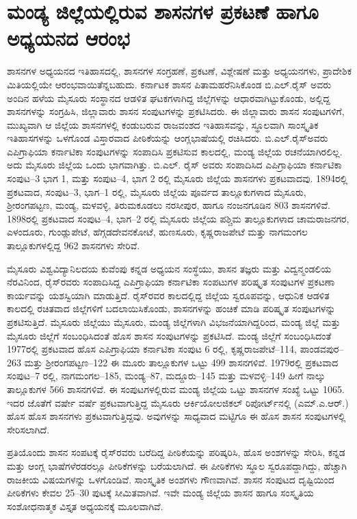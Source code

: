 \section{ಮಂಡ್ಯ ಜಿಲ್ಲೆಯಲ್ಲಿರುವ ಶಾಸನಗಳ ಪ್ರಕಟಣೆ ಹಾಗೂ ಅಧ್ಯಯನದ ಆರಂಭ}

ಶಾಸನಗಳ ಅಧ್ಯಯನದ ಇತಿಹಾಸದಲ್ಲಿ, ಶಾಸನಗಳ ಸಂಗ್ರಹಣೆ, ಪ್ರಕಟಣೆ, ವಿಶ್ಲೇಷಣೆ ಮತ್ತು ಅಧ್ಯಯನಗಳು, ಪ್ರಾದೇಶಿಕ ಮಿತಿಯಲ್ಲಿಯೇ ಆರಂಭವಾಯಿತೆನ್ನಬಹುದು. ಕರ್ನಾಟಕ ಶಾಸನ ಪಿತಾಮಹರೆನಿಸಿಕೊಂಡ ಬಿ.ಎಲ್​.ರೈಸ್​ ಅವರು ಅಂದಿನ ಹಳೆಯ ಮೈಸೂರು ಸಂಸ್ಥಾನದ ಆಡಳಿತ ಘಟಕಗಳಾಗಿದ್ದ ಜಿಲ್ಲೆಗಳನ್ನು ಆಧಾರವಾಗಿಟ್ಟುಕೊಂಡು, ಅಲ್ಲಿದ್ದ ಶಾಸನಗಳನ್ನು ಸಂಗ್ರಹಿಸಿ, ಜಿಲ್ಲಾವಾರು ಶಾಸನ ಸಂಪುಟಗಳನ್ನು ಪ್ರಕಟಿಸಿದರು. ಈ ಜಿಲ್ಲಾವಾರು ಶಾಸನ ಸಂಪುಟಗಳಿಗೆ, ಮುಖ್ಯವಾಗಿ ಆ ಜಿಲ್ಲೆಯ ಶಾಸನಗಳಲ್ಲಿ ಕಂಡುಬರುವ ರಾಜವಂಶದ ಇತಿಹಾಸವನ್ನು, ಸ್ಥೂಲವಾಗಿ ಸಾಂಸ್ಕೃತಿಕ ಇತಿಹಾಸಗಳನ್ನು ಒಳಗೊಂಡ ವಿಸ್ತಾರವಾದ ಪೀಠಿಕೆಯನ್ನು ಆಂಗ್ಲಭಾಷೆಯಲ್ಲಿ ರಚಿಸಿದರು. ಬಿ.ಎಲ್​.ರೈಸ್​ ಅವರು ಎಪಿಗ್ರಾಫಿಯಾ ಕರ್ನಾಟಿಕಾ ಸಂಪುಟಗಳನ್ನು ಸಂಪಾದಿಸಿ ಪ್ರಕಟಿಸುವ ಕಾಲದಲ್ಲಿ, ಮಂಡ್ಯ ಜಿಲ್ಲೆಯ ರಚನೆಯಾಗಿರಲಿಲ್ಲ. ಅದು ಮೈಸೂರು ಜಿಲ್ಲೆಯ ಒಂದು ಭಾಗವಾಗಿತ್ತು. ಬಿ.ಎಲ್​. ರೈಸ್​ ಅವರು ಸಂಪಾದಿಸಿದ ಎಪಿಗ್ರಾಫಿಯಾ ಕರ್ನಾಟಿಕಾ ಸಂಪುಟ–3 ಭಾಗ 1, ಮತ್ತು ಸಂಪುಟ–4, ಭಾಗ 2 ರಲ್ಲಿ ಮೈಸೂರು ಜಿಲ್ಲೆಯ ಶಾಸನಗಳು ಪ್ರಕಟವಾದವು. 1894ರಲ್ಲಿ ಪ್ರಕಟವಾದ, ಸಂಪುಟ–3, ಭಾಗ–1 ರಲ್ಲಿ, ಮೈಸೂರು ಜಿಲ್ಲೆಯ ಪೂರ್ವದ ತಾಲ್ಲೂಕುಗಳಾದ ಮೈಸೂರು, ಶ‍್ರೀರಂಗಪಟ್ಟಣ, ಮಂಡ್ಯ, ಮಳವಳ್ಳಿ, ತಿರುಮಕೂಡಲು ನರಸೀಪುರ, ಹಾಗೂ ನಂಜನಗೂಡಿನ 803 ಶಾಸನಗಳಿವೆ. 1898ರಲ್ಲಿ ಪ್ರಕಟವಾದ ಸಂಪುಟ–4, ಭಾಗ–2 ರಲ್ಲಿ ಮೈಸೂರು ಜಿಲ್ಲೆಯ ಪಶ್ಚಿಮ ತಾಲ್ಲೂಕುಗಳಾದ ಚಾಮರಾಜನಗರ, ಎಳಂದೂರು, ಗುಂಡ್ಲುಪೇಟೆ, ಹೆಗ್ಗಡದೇವನಕೋಟೆ, ಹುಣಸೂರು, ಕೃಷ್ಣರಾಜಪೇಟೆ ಮತ್ತು ನಾಗಮಂಗಲ ತಾಲ್ಲೂಕುಗಳಲ್ಲಿದ್ದ 962 ಶಾಸನಗಳು ಸೇರಿವೆ.

ಮೈಸೂರು ವಿಶ್ವವಿದ್ಯಾನಿಲದಯ ಕುವೆಂಪು ಕನ್ನಡ ಅಧ್ಯಯನ ಸಂಸ್ಥೆಯು, ಶಾಸನ ತಜ್ಞರು ಮತ್ತು ವಿದ್ವನ್ಮಂಡಲಿಯ ನೆರವಿನಿಂದ, ರೈಸ್​ರವರು ಸಂಪಾದಿಸಿದ್ದ ಎಪಿಗ್ರಾಫಿಯಾ ಕರ್ನಾಟಿಕಾ ಸಂಪಟುಗಳ ಪರಿಷ್ಕೃತ ಸಂಪುಟಗಳ ಪ್ರಕಟಣಾ ಕಾರ್ಯವನ್ನು ಯಶಸ್ವಿಯಾಗಿ ಮಾಡುತ್ತಿದೆ. ರೈಸ್​ರವರ ಕಾಲದಲ್ಲಿದ್ದ ಜಿಲ್ಲೆಯ ಸ್ವರೂಪವನ್ನು, ಆಧುನಿಕ ಆಡಳಿತ ಕಾಲದಲ್ಲಿ ರಚಿತವಾದ ಜಿಲ್ಲೆಗಳಿಗೆ ಬದಲಾಯಿಸಿಕೊಂಡು, ಶಾಸನಗಳನ್ನು ಹಂಚಿಕೆ ಮಾಡಿ ಪರಿಷ್ಕೃತ ಸಂಪುಟಗಳನ್ನು ಪ್ರಕಟಿಸುತ್ತಿದೆ. ಮೈಸೂರು ಜಿಲ್ಲೆಯು ಮೈಸೂರು, ಮಂಡ್ಯ ಜಿಲ್ಲೆಗಳಾಗಿ ವಿಭಜನೆಯಾಗಿದ್ದರಿಂದ, ಮಂಡ್ಯ ಜಿಲ್ಲೆ ಮತ್ತು ಮೈಸೂರು ಜಿಲ್ಲೆಗೆ ಸಂಬಂಧಿಸಿದಂತೆ ಹೊಸ ಶಾಸನ ಸಂಪುಟಗಳನ್ನು ಪ್ರಕಟಿಸಿದೆ. ಮಂಡ್ಯ ಜಿಲ್ಲೆಗೆ ಸಂಬಂಧಿಸಿದಂತೆ 1977ರಲ್ಲಿ ಪ್ರಕಟವಾದ ಹೊಸ ಎಪಿಗ್ರಾಫಿಯಾ ಕರ್ನಾಟಿಕಾ ಸಂಪುಟ 6 ರಲ್ಲಿ, ಕೃಷ್ಣರಾಜಪೇಟೆ–114, ಪಾಂಡವಪುರ–263 ಮತ್ತು ಶ‍್ರೀರಂಗಪಟ್ಟಣ–122 ಈ ಮೂರು ತಾಲ್ಲೂಕುಗಳ ಒಟ್ಟು 499 ಶಾಸನಗಳಿವೆ. 1979ರಲ್ಲಿ ಪ್ರಕಟವಾದ ಸಂಪುಟ–7 ರಲ್ಲಿ, ನಾಗಮಂಗಲ–185, ಮಂಡ್ಯ–87, ಮದ್ದೂರು–145 ಮತ್ತು ಮಳವಳ್ಳಿ–149 ಹೀಗೆ ನಾಲ್ಕು ತಾಲ್ಲೂಕುಗಳ 566 ಶಾಸನಗಳಿವೆ. ಈ ಸಂಪುಟಗಳಲ್ಲಿರುವ ಮಂಡ್ಯ ಜಿಲ್ಲೆಯ ಒಟ್ಟು ಶಾಸನಗಳ ಸಂಖ್ಯೆ ಒಟ್ಟು 1065. ಇದರ ಜೊತೆಗೆ ವರ್ಷೇ ವರ್ಷೆ ಪ್ರಕಟವಾಗುತ್ತಿದ್ದ ಮೈಸೂರು ಆರ್ಕಿಯೋಲಜಿಕಲ್​ ರಿಪೋರ್ಟ್‌ನಲ್ಲಿ (ಎಮ್.ಎ.ಆರ್​.) ಹೊಸ ಹೊಸ ಶಾಸನಗಳು ಪ್ರಕಟವಾಗುತ್ತಿದ್ದವು. ಅವುಗಳನ್ನು ಸಾಧ್ಯವಾದ ಮಟ್ಟಿಗೂ ಈ ಹೊಸ ಶಾಸನ ಸಂಪುಟಗಳಲ್ಲಿ ಸೇರಿಸಲಾಗಿದೆ.

ಪ್ರತಿಯೊಂದು ಶಾಸನ ಸಂಪಟಕ್ಕೆ ರೈಸ್​ರವರು ಬರೆದಿದ್ದ ಪೀಠಿಕೆಯನ್ನು ಪರಿಷ್ಕರಿಸಿ, ಹೊಸ ಅಂಶಗಳನ್ನು ಸೇರಿಸಿ, ಕನ್ನಡ ಮತ್ತು ಆಂಗ್ಲ ಭಾಷೆಗಳೆರಡರಲ್ಲೂ ಪೀಠಿಕೆಗಳನ್ನು ಬರೆಯಲಾಗಿದೆ. ಈ ಪೀಠಿಕೆಗಳು ಸ್ಥೂಲ ಸ್ವರೂಪದ್ದಾಗಿದ್ದು, ಹೆಚ್ಚಾಗಿ ರಾಜಕೀಯ ವಿಷಯಗಳನ್ನು ಒಳಗೊಂಡಿವೆ. ಸಾಂಸ್ಕೃತಿಕ ಅಂಶಗಳು ಗೌಣವಾಗಿವೆ. ಶಾಸನ ಸಂಪುಟದ ದೃಷ್ಟಿಯಿಂದ ಪೀಠಿಕೆಗಳು ಕೇವಲ 25–30 ಪುಟಕ್ಕೆ ಸೀಮಿತವಾಗಿವೆ. ಇವೇ ಮಂಡ್ಯ ಜಿಲ್ಲೆಯ ಶಾಸನ ಹಾಗೂ ಸಂಸ್ಕೃತಿಯ ಸಂಶೋಧನಾತ್ಮಕ ವಿಸ್ತೃತ ಅಧ್ಯಯನಕ್ಕೆ ಮೂಲವಾಗಿವೆ.

